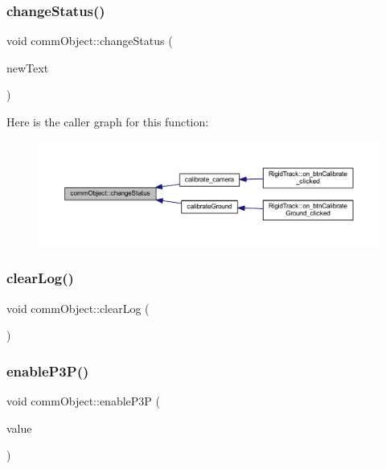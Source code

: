 \subsubsection{\texorpdfstring{change\+Status()}{changeStatus()}}
{\footnotesize\ttfamily void comm\+Object\+::change\+Status (\begin{DoxyParamCaption}\item[{Q\+String}]{new\+Text }\end{DoxyParamCaption})}

Here is the caller graph for this function\+:\nopagebreak
\begin{figure}[H]
\begin{center}
\leavevmode
\includegraphics[width=350pt]{classcomm_object_a1f4b8dd22ecc46bab619f6b1fe1a5144_icgraph}
\end{center}
\end{figure}
\mbox{\label{classcomm_object_a785f776d16f1871786bb88482fc4dd1f}} 
\subsubsection{\texorpdfstring{clear\+Log()}{clearLog()}}
{\footnotesize\ttfamily void comm\+Object\+::clear\+Log (\begin{DoxyParamCaption}{ }\end{DoxyParamCaption})}

\mbox{\label{classcomm_object_a7552116eb5e18c49c6dcf943de29af7a}} 
\subsubsection{\texorpdfstring{enable\+P3\+P()}{enableP3P()}}
{\footnotesize\ttfamily void comm\+Object\+::enable\+P3P (\begin{DoxyParamCaption}\item[{bool}]{value }\end{DoxyParamCaption})}

